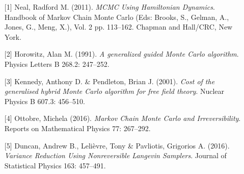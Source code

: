 \begin{talk}
\medskip

\begin{enumerate}
	\item[{[1]}] Neal, Radford M. (2011). {\it MCMC Using Hamiltonian Dynamics}. Handbook of Markov Chain Monte Carlo (Eds: Brooks, S., Gelman, A., Jones, G., Meng, X.), Vol. 2 pp. 113--162. Chapman and Hall/CRC, New York.
	\item[{[2]}] Horowitz, Alan M. (1991). {\it A generalized guided Monte Carlo algorithm}. Physics Letters B 268.2: 247--252. 
	\item[{[3]}] Kennedy, Anthony D. \& Pendleton, Brian J. (2001). {\it Cost of the generalised hybrid Monte Carlo algorithm for free field theory}. Nuclear Physics B 607.3: 456--510.
	\item[{[4]}] Ottobre, Michela (2016). {\it Markov Chain Monte Carlo and Irreversibility}. Reports on Mathematical Physics 77: 267--292.
	\item[{[5]}] Duncan, Andrew B., Leli\`evre, Tony \& Pavliotis, Grigorios A. (2016). {\it Variance Reduction Using Nonreversible Langevin Samplers}. Journal of Statistical Physics 163: 457--491. 
\end{enumerate}

\end{talk}

